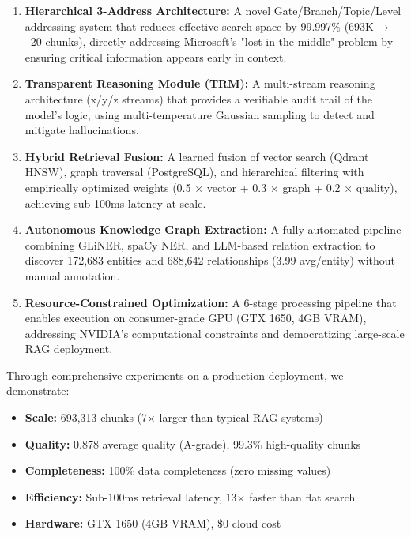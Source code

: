 \documentclass[11pt]{article}
\begin{document}
\begin{enumerate}
    \item \textbf{Hierarchical 3-Address Architecture:} A novel Gate/Branch/Topic/Level addressing system that reduces effective search space by 99.997\% (693K → ~20 chunks), directly addressing Microsoft's "lost in the middle" problem by ensuring critical information appears early in context.
    
    \item \textbf{Transparent Reasoning Module (TRM):} A multi-stream reasoning architecture (x/y/z streams) that provides a verifiable audit trail of the model's logic, using multi-temperature Gaussian sampling to detect and mitigate hallucinations.

    \item \textbf{Hybrid Retrieval Fusion:} A learned fusion of vector search (Qdrant HNSW), graph traversal (PostgreSQL), and hierarchical filtering with empirically optimized weights (0.5 × vector + 0.3 × graph + 0.2 × quality), achieving sub-100ms latency at scale.
    
    \item \textbf{Autonomous Knowledge Graph Extraction:} A fully automated pipeline combining GLiNER, spaCy NER, and LLM-based relation extraction to discover 172,683 entities and 688,642 relationships (3.99 avg/entity) without manual annotation.
    
    \item \textbf{Resource-Constrained Optimization:} A 6-stage processing pipeline that enables execution on consumer-grade GPU (GTX 1650, 4GB VRAM), addressing NVIDIA's computational constraints and democratizing large-scale RAG deployment.
\end{enumerate}

Through comprehensive experiments on a production deployment, we demonstrate:

\begin{itemize}
    \item \textbf{Scale:} 693,313 chunks (7× larger than typical RAG systems)
    \item \textbf{Quality:} 0.878 average quality (A-grade), 99.3\% high-quality chunks
    \item \textbf{Completeness:} 100\% data completeness (zero missing values)
    \item \textbf{Efficiency:} Sub-100ms retrieval latency, 13× faster than flat search
    \item \textbf{Hardware:} GTX 1650 (4GB VRAM), \$0 cloud cost
\end{itemize}
\end{document}

